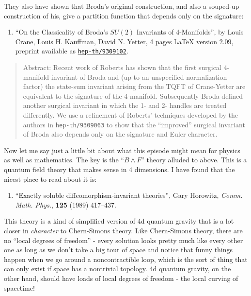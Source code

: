 \documentclass{article}
\def\tightlist{}
\begin{document}
They also have shown that Broda's original construction, and also a
souped-up construction of his, give a partition function that depends
only on the signature:

\begin{enumerate}
\def\labelenumi{\arabic{enumi})}
\setcounter{enumi}{1}
\tightlist
\item
  ``On the Classicality of Broda's \(SU(2)\) Invariants of
  4-Manifolds'', by Louis Crane, Louis H. Kauffman, David N. Yetter, 4
  pages LaTeX version 2.09, preprint available as
  \href{http://xxx.lanl.gov/abs/hep-th/9309102}{\texttt{hep-th/9309102}}.
\end{enumerate}

\begin{quote}
Abstract: Recent work of Roberts has shown that the first surgical
4-manifold invariant of Broda and (up to an unspecified normalization
factor) the state-sum invariant arising from the TQFT of Crane-Yetter
are equivalent to the signature of the 4-manifold. Subsequently Broda
defined another surgical invariant in which the 1- and 2- handles are
treated differently. We use a refinement of Roberts' techniques
developed by the authors in \texttt{hep-th/9309063} to show that the
``improved'' surgical invariant of Broda also depends only on the
signature and Euler character.
\end{quote}

Now let me say just a little bit about what this episode might mean for
physics as well as mathematics. The key is the ``\(B \wedge F\)'' theory
alluded to above. This is a quantum field theory that makes sense in 4
dimensions. I have found that the nicest place to read about it is:

\begin{enumerate}
\def\labelenumi{\arabic{enumi})}
\setcounter{enumi}{2}
\tightlist
\item
  ``Exactly soluble diffeomorphism-invariant theories'', Gary Horowitz,
  \emph{Comm. Math. Phys.}, \textbf{125} (1989) 417--437.
\end{enumerate}

This theory is a kind of simplified version of 4d quantum gravity that
is a lot closer in \emph{character} to Chern-Simons theory. Like
Chern-Simons theory, there are no ``local degrees of freedom'' - every
solution looks pretty much like every other one as long as we don't take
a big tour of space and notice that funny things happen when we go
around a noncontractible loop, which is the sort of thing that can only
exist if space has a nontrivial topology. 4d quantum gravity, on the
other hand, should have loads of local degrees of freedom - the local
curving of spacetime!
\end{document}
